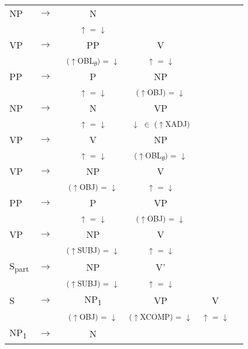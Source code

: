 \documentclass[12pt,a4paper]{article}
\begin{document}
\begin{singlespace}
\begin{tabular}{ l  l  c  c  c  c }
    NP & $\rightarrow$ & N \\
   & $\qquad$ & \textsuperscript{$\uparrow$ = $\downarrow$} \\
    VP & $\rightarrow$ & PP & V & \\
   & $\qquad$ & \textsuperscript{($\uparrow$OBL\textsubscript{$\theta$}) = $\downarrow$ } & \textsuperscript{$\uparrow$ = $\downarrow$} \\
   		 PP & $\rightarrow$ & P & NP \\
   & $\qquad$ & \textsuperscript{$\uparrow$ = $\downarrow$} & \textsuperscript{($\uparrow$OBJ) = $\downarrow$} \\
       NP & $\rightarrow$ & N & VP \\
   & $\qquad$ & \textsuperscript{$\uparrow$ = $\downarrow$} & \textsuperscript{$\downarrow$ $\in$ ($\uparrow$XADJ)} \\
		    VP & $\rightarrow$ & V & NP \\
   & $\qquad$ & \textsuperscript{$\uparrow$ = $\downarrow$} & \textsuperscript{($\uparrow$OBL\textsubscript{$\theta$}) = $\downarrow$ }  \\
		    VP & $\rightarrow$ & NP & V \\
   & $\qquad$ & \textsuperscript{($\uparrow$OBJ) = $\downarrow$} & \textsuperscript{$\uparrow$ = $\downarrow$} \\
		    PP & $\rightarrow$ & P & VP \\
   & $\qquad$ & \textsuperscript{$\uparrow$ = $\downarrow$} & \textsuperscript{($\uparrow$OBJ) = $\downarrow$} \\
	    VP & $\rightarrow$ &  NP& V \\
   & $\qquad$ & \textsuperscript{($\uparrow$SUBJ) = $\downarrow$} &\textsuperscript{$\uparrow$ = $\downarrow$} \\
   S\textsubscript{part} & $\rightarrow$ & NP & V'\\
   & \textsuperscript{$\qquad$} & \textsuperscript{($\uparrow$SUBJ) = $\downarrow$} & \textsuperscript{$\uparrow$ = $\downarrow$} \\

  S & $\rightarrow$ & NP\textsubscript{1} & VP & V\\
   & $\qquad$ & \textsuperscript{($\uparrow$OBJ) = $\downarrow$} & \textsuperscript{($\uparrow$XCOMP) = $\downarrow$} & \textsuperscript{$\uparrow$ = $\downarrow$} \\
    NP\textsubscript{1} & $\rightarrow$ & N \\
\end{tabular} 
\newline
\newline
\end{singlespace}
\end{document}
